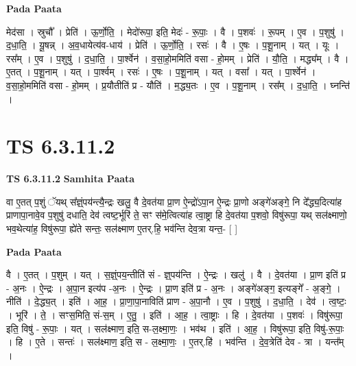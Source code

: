 \documentclass[17pt]{extarticle}
\begin{document}
\textbf{Pada Paata} \newline

मेद॑सा । स्रुचौ᳚ । प्रेति॑ । ऊ॒र्णो॒ति॒ । मेदो॑रूपा॒ इति॒ मेदः॑ - रू॒पाः॒ । वै । प॒शवः॑ । रू॒पम् । ए॒व । प॒शुषु॑ । द॒धा॒ति॒ । यू॒षन्न् । अ॒व॒धायेत्य॑व-धाय॑ । प्रेति॑ । ऊ॒र्णो॒ति॒ । रसः॑ । वै । ए॒षः । प॒शू॒नाम् । यत् । यूः । रस᳚म् । ए॒व । प॒शुषु॑ । द॒धा॒ति॒ । पा॒र्श्वेन॑ । व॒सा॒हो॒ममिति॑ वसा - हो॒मम् । प्रेति॑ । यौ॒ति॒ । मद्ध्य᳚म् । वै । ए॒तत् । प॒शू॒नाम् । यत् । पा॒र्श्वम् । रसः॑ । ए॒षः । प॒शू॒नाम् । यत् । वसा᳚ । यत् । पा॒र्श्वेन॑ । व॒सा॒हो॒ममिति॑ वसा - हो॒मम् । प्र॒यौतीति॑ प्र - यौति॑ । म॒द्ध्य॒तः । ए॒व । प॒शू॒नाम् । रस᳚म् । द॒धा॒ति॒ । घ्नन्ति॑ ।  \newline




\section*{ TS 6.3.11.2 }

\textbf{TS 6.3.11.2 } \newline
\textbf{Samhita Paata} \newline

वा ए॒तत् प॒शुं ॅयथ् स᳚ज्ञ्ं॒पय॑न्त्यै॒न्द्रः खलु॒ वै दे॒वत॑या प्रा॒ण ऐ॒न्द्रो॑ऽपा॒न ऐ॒न्द्रः प्रा॒णो अङ्गे॑अङ्गे॒ नि दे᳚द्ध्य॒दित्या॑ह प्राणापा॒नावे॒व प॒शुषु॑ दधाति॒ देव॑ त्वष्ट॒र्भूरि॑ ते॒ सꣳ स॑मे॒त्वित्या॑ह त्वा॒ष्ट्रा हि दे॒वत॑या प॒शवो॒ विषु॑रूपा॒ यथ् सल॑क्ष्माणो॒ भव॒थेत्या॑ह॒ विषु॑रूपा॒ ह्ये॑ते सन्तः॒ सल॑क्ष्माण ए॒तर्.हि॒ भव॑न्ति देव॒त्रा यन्त॒- [  ] \newline

\textbf{Pada Paata} \newline

वै । ए॒तत् । प॒शुम् । यत् । स॒ज्ञ्ं॒पय॒न्तीति॑ सं - ज्ञ्॒पय॑न्ति । ऐ॒न्द्रः । खलु॑ । वै । दे॒वत॑या । प्रा॒ण इति॑ प्र - अ॒नः । ऐ॒न्द्रः । अ॒पा॒न इत्य॑प -अ॒नः । ऐ॒न्द्रः । प्रा॒ण इति॑ प्र - अ॒नः । अङ्गे॑अङ्ग॒ इत्यङ्गे᳚ - अ॒ङ्गे॒ । नीति॑ । दे॒द्ध्य॒त् । इति॑ । आ॒ह॒ । प्रा॒णा॒पा॒नाविति॑ प्राण - अ॒पा॒नौ । ए॒व । प॒शुषु॑ । द॒धा॒ति॒ । देव॑ । त्व॒ष्टः॒ । भूरि॑ । ते॒ । सꣳस॒मिति॒ सं-स॒म् । ए॒तु॒ । इति॑ । आ॒ह॒ । त्वा॒ष्ट्राः । हि । दे॒वत॑या । प॒शवः॑ । विषु॑रूपा॒ इति॒ विषु॑ - रू॒पाः॒ । यत् । सल॑क्ष्माण॒ इति॒ स-ल॒क्ष्मा॒णः॒ । भव॑थ । इति॑ । आ॒ह॒ । विषु॑रूपा॒ इति॒ विषु॑-रू॒पाः॒ । हि । ए॒ते । सन्तः॑ । सल॑क्ष्माण॒ इति॒ स - ल॒क्ष्मा॒णः॒ । ए॒तर्.हि॑ । भव॑न्ति । दे॒व॒त्रेति॑ देव - त्रा । यन्त᳚म् ।  \newline
\end{document}
